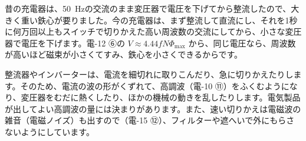 \begin{phmijika}[ACアダプターが小さくなったわけ]
昔の充電器は、\qty{50}{Hz}の交流のまま変圧器で電圧を下げてから整流したので、大きく重い鉄心が要りました。今の充電器は、まず整流して直流にし、それを1秒に何万回以上もスイッチで切りかえた高い周波数の交流にしてから、小さな変圧器で電圧を下げます。電-12 ⑥の $V\approx4.44fN\Phi_{\max}$ から、同じ電圧なら、周波数が高いほど磁束が小さくてすみ、鉄心を小さくできるからです。
\end{phmijika}

整流器やインバーターは、電流を細切れに取りこんだり、急に切りかえたりします。そのため、電流の波の形がくずれて、高調波（電-10 ⑪）をふくむようになり、変圧器をむだに熱くしたり、ほかの機械の動きを乱したりします。電気製品が出してよい高調波の量には決まりがあります。また、速い切りかえは電磁波の雑音（電磁ノイズ）も出すので（電-15 ⑫）、フィルターや遮へいで外にもらさないようにしています。

